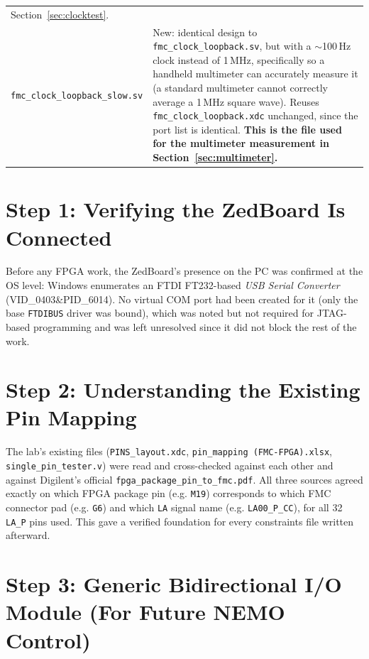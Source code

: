 \documentclass[11pt]{article}
\begin{document}
\begin{center}
\begin{tabular}{@{}p{5.2cm}p{9.5cm}@{}}
    Section~\ref{sec:clocktest}. \\
    \texttt{fmc\_clock\_loopback\_slow.sv} & New: identical design to
    \texttt{fmc\_clock\_loopback.sv}, but with a $\sim$100\,Hz clock instead of 1\,MHz,
    specifically so a handheld multimeter can accurately measure it (a standard
    multimeter cannot correctly average a 1\,MHz square wave). Reuses
    \texttt{fmc\_clock\_loopback.xdc} unchanged, since the port list is identical.
    \textbf{This is the file used for the multimeter measurement in
    Section~\ref{sec:multimeter}.} \\
\bottomrule
\end{tabular}
\end{center}

\section{Step 1: Verifying the ZedBoard Is Connected}

Before any FPGA work, the ZedBoard's presence on the PC was confirmed at the OS level:
Windows enumerates an FTDI FT232-based \emph{USB Serial Converter}
(VID\_0403\&PID\_6014). No virtual COM port had been created for it (only the base
\texttt{FTDIBUS} driver was bound), which was noted but not required for JTAG-based
programming and was left unresolved since it did not block the rest of the work.

\section{Step 2: Understanding the Existing Pin Mapping}

The lab's existing files (\texttt{PINS\_layout.xdc},
\texttt{pin\_mapping (FMC-FPGA).xlsx}, \texttt{single\_pin\_tester.v}) were read and
cross-checked against each other and against Digilent's official
\texttt{fpga\_package\_pin\_to\_fmc.pdf}. All three sources agreed exactly on which FPGA
package pin (e.g. \texttt{M19}) corresponds to which FMC connector pad (e.g. \texttt{G6})
and which \texttt{LA} signal name (e.g. \texttt{LA00\_P\_CC}), for all 32 \texttt{LA\_P}
pins used. This gave a verified foundation for every constraints file written afterward.

\section{Step 3: Generic Bidirectional I/O Module (For Future NEMO Control)}
\end{document}

